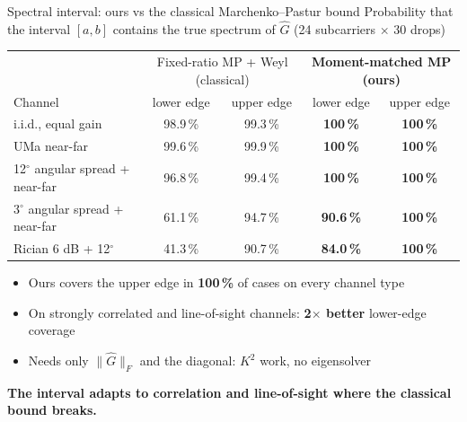 \documentclass[aspectratio=169,11pt,xcolor=table]{beamer}
\newcommand{\gd}[1]{\textcolor{good}{\textbf{#1}}}
\newcommand{\best}[1]{\textbf{\textcolor{good}{#1}}}
\newcommand{\takeaway}[1]{%
  \vfill
  \begin{alertblock}{}\centering\textbf{#1}\end{alertblock}}
\begin{document}
\begin{frame}{Spectral interval: ours vs the classical Marchenko--Pastur bound}
  \centering
  \small Probability that the interval $[a,b]$ contains the true spectrum of $\hat G$ (24 subcarriers $\times$ 30 drops)\\[2mm]
  \footnotesize
  \begin{tabular}{lcc|cc}
    \toprule
    & \multicolumn{2}{c|}{Fixed-ratio MP + Weyl (classical)} & \multicolumn{2}{c}{\textbf{Moment-matched MP (ours)}} \\
    Channel & lower edge & upper edge & lower edge & upper edge \\
    \midrule
    i.i.d., equal gain & 98.9\,\% & 99.3\,\% & \best{100\,\%} & \best{100\,\%} \\
    UMa near-far & 99.6\,\% & 99.9\,\% & \best{100\,\%} & \best{100\,\%} \\
    12$^\circ$ angular spread + near-far & 96.8\,\% & 99.4\,\% & \best{100\,\%} & \best{100\,\%} \\
    3$^\circ$ angular spread + near-far & 61.1\,\% & 94.7\,\% & \best{90.6\,\%} & \best{100\,\%} \\
    Rician 6 dB + 12$^\circ$ & 41.3\,\% & 90.7\,\% & \best{84.0\,\%} & \best{100\,\%} \\
    \bottomrule
  \end{tabular}
  \vspace{2mm}
  \begin{itemize}\small
    \item Ours covers the upper edge in \gd{100\,\%} of cases on every channel type
    \item On strongly correlated and line-of-sight channels: \gd{2$\times$ better} lower-edge coverage
    \item Needs only $\|\hat G\|_F$ and the diagonal: $K^2$ work, no eigensolver
  \end{itemize}
  \takeaway{The interval adapts to correlation and line-of-sight where the classical bound breaks.}
\end{frame}
\end{document}
